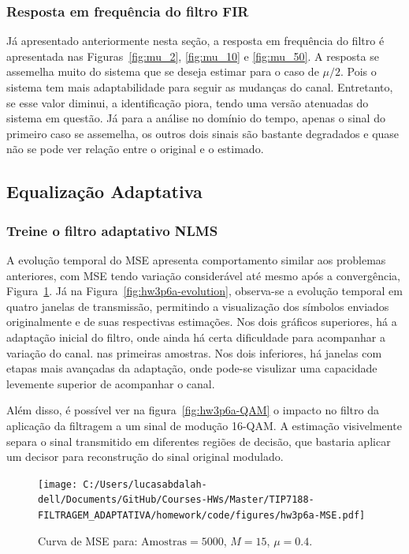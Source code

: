 \subsubsection*{Resposta em frequência do ﬁltro FIR}
Já apresentado anteriormente nesta seção, a resposta em frequência do filtro é apresentada nas Figuras~\ref{fig:mu_2}, \ref{fig:mu_10} e \ref{fig:mu_50}. A resposta se assemelha muito do sistema que se deseja estimar para o caso de $\mu/2$. Pois o sistema tem mais adaptabilidade para seguir as mudanças do canal. Entretanto, se esse valor diminui, a identificação piora, tendo uma versão atenuadas do sistema em questão. Já para a análise no domínio do tempo, apenas o sinal do primeiro caso se assemelha, os outros dois sinais são bastante degradados e quase não se pode ver relação entre o original e o estimado.


\subsection{Equalização Adaptativa} %


\subsubsection*{Treine o ﬁltro adaptativo NLMS}

A evolução temporal do MSE apresenta comportamento similar aos problemas anteriores, com MSE tendo variação considerável até mesmo após a convergência, Figura~\ref{fig:hw3p6a-MSE}. Já na Figura~\ref{fig:hw3p6a-evolution}, observa-se a evolução temporal em quatro janelas de transmissão, permitindo a visualização dos símbolos enviados originalmente e de suas respectivas estimações.  Nos dois gráficos superiores, há a adaptação inicial do filtro, onde ainda há certa dificuldade para acompanhar a variação do canal. nas primeiras amostras. Nos dois inferiores, há janelas com etapas mais avançadas da adaptação, onde pode-se visulizar uma capacidade levemente superior de acompanhar o canal.

Além disso, é possível ver na figura~\ref{fig:hw3p6a-QAM} o impacto no filtro da aplicação da filtragem a um sinal de modução 16-QAM. A estimação visivelmente separa o sinal transmitido em diferentes regiões de decisão, que bastaria aplicar um decisor para reconstrução do sinal original modulado.


\clearpage

\begin{figure}[!htp]
    \centering
    \texttt{[image: C:/Users/lucasabdalah-dell/Documents/GitHub/Courses-HWs/Master/TIP7188-FILTRAGEM\_ADAPTATIVA/homework/code/figures/hw3p6a-MSE.pdf]}
    \caption{Curva de MSE para: $\text{Amostras} = 5000$, $M = 15$, $\mu = 0.4$.}
    \label{fig:hw3p6a-MSE}
\end{figure}


